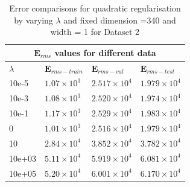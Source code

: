 {
\begin{table}[hptb]
\begin{tabular}{ |p{1.5cm}|p{3cm}|p{3cm}| p{3cm}|  }
\hline
\multicolumn{4}{|c|}{$\mathbf{E}_{rms}$ values for different data } \\
\hline
\rowcolor{lightgray} $\lambda$ & $\mathbf{E}_{rms-train}$ & $\mathbf{E}_{rms-val}$ & $\mathbf{E}_{rms-test}$ \\
\hline
  10e-5  &  $1.07 \times 10^3$       &       $2.517 \times 10^4$ & $1.979 \times 10^4$  \\
 \hline
  10e-3  &   $1.08 \times 10^3$       &       $2.520 \times 10^4$        &     $1.974 \times 10^4$     \\
 \hline
  10e-1  &   $1.17 \times 10^3$       &       $2.529 \times 10^4$       &     $1.983 \times 10^4$    \\
 \hline
  0  &    $1.01 \times 10^3$     &      $2.516 \times 10^4 $         &     $1.979 \times 10^4$      \\
  \hline
  10     &   $2.84 \times 10^4$   &        $3.852 \times 10^4$         &     $3.782 \times 10^4$      \\
  \hline
  10e+03   &   $5.11 \times 10^4$    &         $5.919 \times 10^4$      &      $6.081 \times 10^4$        \\
  \hline
  10e+05  &    $5.20 \times 10^4$  &         $6.001 \times 10^4$       &        $6.170 \times 10^4$      \\
\hline
\end{tabular}
\caption{Error comparisons for quadratic regularisation by varying $\lambda $  and fixed dimension =340 and width = 1 for Dataset 2}
\label{table:9}
\end{table}
}


